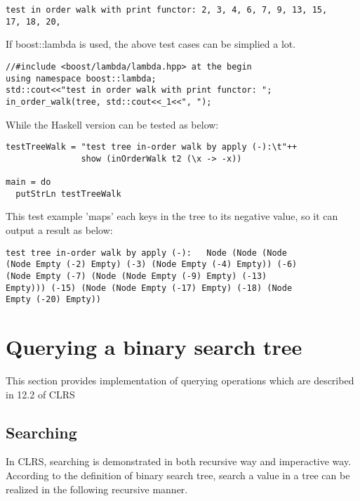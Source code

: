 \documentclass{article}
\begin{document}
\begin{verbatim}
test in order walk with print functor: 2, 3, 4, 6, 7, 9, 13, 15, 
17, 18, 20,
\end{verbatim}

If boost::lambda is used, the above test cases can be simplied
a lot.
\begin{lstlisting}
//#include <boost/lambda/lambda.hpp> at the begin
using namespace boost::lambda;
std::cout<<"test in order walk with print functor: ";
in_order_walk(tree, std::cout<<_1<<", ");
\end{lstlisting}

While the Haskell version can be tested as below:

\lstset{language=Haskell}
\begin{lstlisting}
testTreeWalk = "test tree in-order walk by apply (-):\t"++
               show (inOrderWalk t2 (\x -> -x))

main = do
  putStrLn testTreeWalk
\end{lstlisting}

This test example 'maps' each keys in the tree to its negative value,
so it can output a result as below:

\begin{verbatim}
test tree in-order walk by apply (-):   Node (Node (Node 
(Node Empty (-2) Empty) (-3) (Node Empty (-4) Empty)) (-6) 
(Node Empty (-7) (Node (Node Empty (-9) Empty) (-13) 
Empty))) (-15) (Node (Node Empty (-17) Empty) (-18) (Node 
Empty (-20) Empty))
\end{verbatim}

\section{Querying a binary search tree}

This section provides implementation of querying operations which are
described in 12.2 of CLRS\cite{CLRS}

\subsection{Searching}
In CLRS\cite{CLRS}, searching is demonstrated in both recursive way and 
imperactive way. According to the definition of binary search tree, search
a value in a tree can be realized in the following recursive manner.
\end{document}
